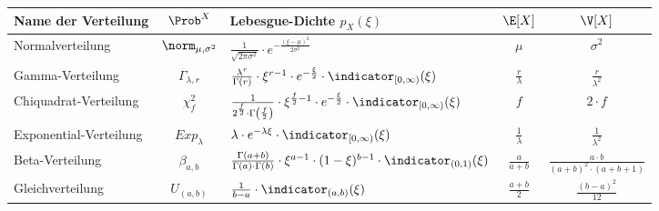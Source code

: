 \begin{table}
	\renewcommand{\arraystretch}{1.6}
	\centering
	\begin{tabular}{l | c | l | c | c}
		Name der Verteilung			&	$\Prob^X$				& 	Lebesgue-Dichte $p_X(\xi)$																								& $\E[X]$ 				&	$\V[X]$
	\\ \hline
		Normalverteilung			&	$\norm_{\mu, \sigma^2}$	& 	$\frac{1}{\sqrt{2 \pi \sigma^2}} \cdot e^{-\frac{(\xi - \mu)^2}{2 \sigma^2}}$														& $\mu$ 				& 	$\sigma^2$
	\\
		Gamma-Verteilung 			& 	$\Gamma_{\lambda, r}$ 	&	$\frac{\lambda^r}{\Gamma(r)} \cdot \xi^{r - 1} \cdot e^{-\frac{\xi}{2}} \cdot \indicator_{[0, \infty)}(\xi)$									& $\frac{r}{\lambda}$ 	& 	$\frac{r}{\lambda^2}$
	\\
		Chiquadrat-Verteilung			& 	$\chi_f^2$ 			& 	$\frac{1}{2^{\frac{f}{2}} \cdot \Gamma\left( \frac{f}{2} \right)} \cdot \xi^{\frac{f}{2} - 1} \cdot e^{-\frac{\xi}{2}} \cdot \indicator_{[0, \infty)}(\xi)$	& $f$					& 	$2 \cdot f$
	\\
		Exponential-Verteilung			&	$Exp_\lambda$ 			&	$\lambda \cdot e^{-\lambda \xi} \cdot \indicator_{[0, \infty)}(\xi)$ 																& $\frac{1}{\lambda}$	& 	$\frac{1}{\lambda^2}$
	\\
		Beta-Verteilung 				& 	$\beta_{a, b}$ 			& 	$\frac{\Gamma(a + b)}{\Gamma(a) \cdot \Gamma(b)} \cdot \xi^{a - 1} \cdot (1 - \xi)^{b - 1} \cdot \indicator_{(0, 1)}(\xi)$ 						& $\frac{a}{a + b}$ 		&	$\frac{a \cdot b}{(a + b)^2 \cdot (a + b + 1)}$
	\\
		Gleichverteilung 				& 	$U_{(a, b)}$			& 	$\frac{1}{b - a} \cdot \indicator_{(a, b)}(\xi)$ 																				& $\frac{a + b}{2}$ 		& 	$\frac{(b - a)^2}{12}$ 
	\end{tabular}
\end{table}